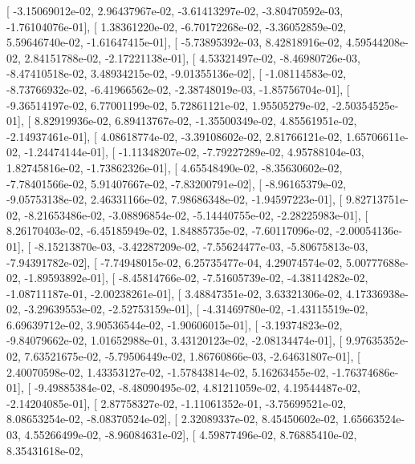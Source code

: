 \documentclass{article}
\begin{document}
       [ -3.15069012e-02,   2.96437967e-02,  -3.61413297e-02,
         -3.80470592e-03,  -1.76104076e-01],
       [  1.38361220e-02,  -6.70172268e-02,  -3.36052859e-02,
          5.59646740e-02,  -1.61647415e-01],
       [ -5.73895392e-03,   8.42818916e-02,   4.59544208e-02,
          2.84151788e-02,  -2.17221138e-01],
       [  4.53321497e-02,  -8.46980726e-03,  -8.47410518e-02,
          3.48934215e-02,  -9.01355136e-02],
       [ -1.08114583e-02,  -8.73766932e-02,  -6.41966562e-02,
         -2.38748019e-03,  -1.85756704e-01],
       [ -9.36514197e-02,   6.77001199e-02,   5.72861121e-02,
          1.95505279e-02,  -2.50354525e-01],
       [  8.82919936e-02,   6.89413767e-02,  -1.35500349e-02,
          4.85561951e-02,  -2.14937461e-01],
       [  4.08618774e-02,  -3.39108602e-02,   2.81766121e-02,
          1.65706611e-02,  -1.24474144e-01],
       [ -1.11348207e-02,  -7.79227289e-02,   4.95788104e-03,
          1.82745816e-02,  -1.73862326e-01],
       [  4.65548490e-02,  -8.35630602e-02,  -7.78401566e-02,
          5.91407667e-02,  -7.83200791e-02],
       [ -8.96165379e-02,  -9.05753138e-02,   2.46331166e-02,
          7.98686348e-02,  -1.94597223e-01],
       [  9.82713751e-02,  -8.21653486e-02,  -3.08896854e-02,
         -5.14440755e-02,  -2.28225983e-01],
       [  8.26170403e-02,  -6.45185949e-02,   1.84885735e-02,
         -7.60117096e-02,  -2.00054136e-01],
       [ -8.15213870e-03,  -3.42287209e-02,  -7.55624477e-03,
         -5.80675813e-03,  -7.94391782e-02],
       [ -7.74948015e-02,   6.25735477e-04,   4.29074574e-02,
          5.00777688e-02,  -1.89593892e-01],
       [ -8.45814766e-02,  -7.51605739e-02,  -4.38114282e-02,
         -1.08711187e-01,  -2.00238261e-01],
       [  3.48847351e-02,   3.63321306e-02,   4.17336938e-02,
         -3.29639553e-02,  -2.52753159e-01],
       [ -4.31469780e-02,  -1.43115519e-02,   6.69639712e-02,
          3.90536544e-02,  -1.90606015e-01],
       [ -3.19374823e-02,  -9.84079662e-02,   1.01652988e-01,
          3.43120123e-02,  -2.08134474e-01],
       [  9.97635352e-02,   7.63521675e-02,  -5.79506449e-02,
          1.86760866e-03,  -2.64631807e-01],
       [  2.40070598e-02,   1.43353127e-02,  -1.57843814e-02,
          5.16263455e-02,  -1.76374686e-01],
       [ -9.49885384e-02,  -8.48090495e-02,   4.81211059e-02,
          4.19544487e-02,  -2.14204085e-01],
       [  2.87758327e-02,  -1.11061352e-01,  -3.75699521e-02,
          8.08653254e-02,  -8.08370524e-02],
       [  2.32089337e-02,   8.45450602e-02,   1.65663524e-03,
          4.55266499e-02,  -8.96084631e-02],
       [  4.59877496e-02,   8.76885410e-02,   8.35431618e-02,
\end{document}
